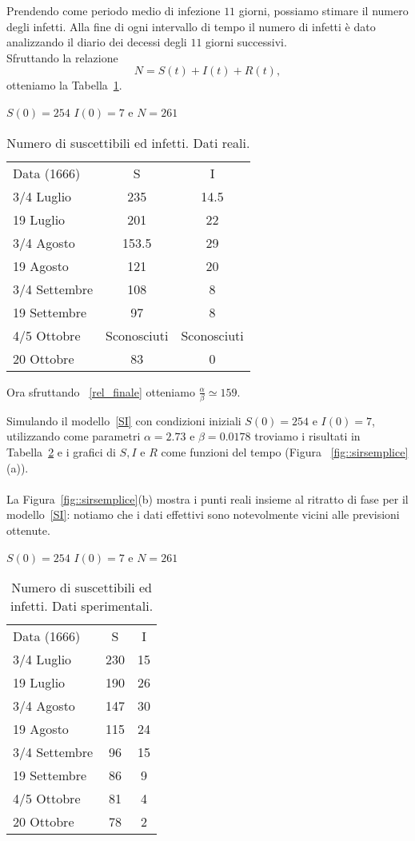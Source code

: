 Prendendo come periodo medio di infezione  $11$ giorni, possiamo stimare il numero degli infetti. Alla fine di ogni intervallo di tempo il numero di infetti \`e dato analizzando il diario dei decessi degli $11$ giorni successivi.\\
Sfruttando la relazione 
$$ N = S(t) + I(t) + R(t),$$ 
otteniamo la Tabella~\ref{table::2}.
\begin{table}[!ht]
\centering
\caption{Numero di suscettibili ed infetti. Dati reali.}

 $S(0) = 254$ $I(0) = 7$ e $N = 261$ 	\\
\label{table::2}
\begin{tabular}{l|c|c}

Data (1666) & S & I\\
\cline{1-3}
3/4 Luglio  & 235& 14.5\\
19 Luglio  & 201 & 22\\
3/4 Agosto  & 153.5& 29\\
19  Agosto  & 121& 20\\
3/4 Settembre  & 108&  8\\
19 Settembre  & 97& 8\\
4/5 Ottobre  & Sconosciuti& Sconosciuti\\
20 Ottobre  & 83& 0\\
 
\end{tabular}
\end{table}

Ora sfruttando ~\eqref{rel_finale} otteniamo $\frac{\alpha}{\beta} \simeq 159$.
\newpage

Simulando il modello~\eqref{SI} con condizioni iniziali $S(0) = 254$ e  $I(0)=7$,   utilizzando come parametri $\alpha =2.73 $ e $\beta  = 0.0178 $ troviamo i risultati in Tabella~\ref{table::3} e i grafici di $S,I$ e $R$ come funzioni del tempo (Figura~
\ref{fig::sirsemplice}(a)).\\  \\
La Figura~\ref{fig::sirsemplice}(b) mostra i punti reali insieme al ritratto di fase per il modello~\eqref{SI}: notiamo che i  dati effettivi sono notevolmente vicini alle previsioni ottenute. \begin{table}[ht]
\centering
\caption{Numero di suscettibili ed infetti. Dati sperimentali.}
$S(0) = 254$ $I(0) = 7$ e $N = 261$ \\
\label{table::3}
\begin{tabular}{l|c|c}

Data (1666) & S & I\\
\cline{1-3}
3/4 Luglio  & 230& 15\\
19 Luglio  & 190 & 26\\
3/4 Agosto  & 147& 30\\
19  Agosto  & 115& 24\\
3/4 Settembre  & 96&  15\\
19 Settembre  & 86& 9\\
4/5 Ottobre  & 81& 4\\
20 Ottobre  & 78& 2\\
 
\end{tabular}
\end{table}

